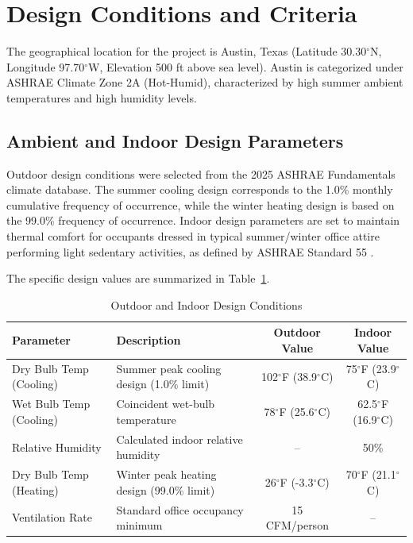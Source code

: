 \section{Design Conditions and Criteria}
\label{sec:design_conditions}

The geographical location for the project is Austin, Texas (Latitude 30.30$^{\circ}$N, Longitude 97.70$^{\circ}$W, Elevation 500 ft above sea level). Austin is categorized under ASHRAE Climate Zone 2A (Hot-Humid), characterized by high summer ambient temperatures and high humidity levels.

\subsection{Ambient and Indoor Design Parameters}
Outdoor design conditions were selected from the 2025 ASHRAE Fundamentals climate database. The summer cooling design corresponds to the 1.0\% monthly cumulative frequency of occurrence, while the winter heating design is based on the 99.0\% frequency of occurrence. Indoor design parameters are set to maintain thermal comfort for occupants dressed in typical summer/winter office attire performing light sedentary activities, as defined by ASHRAE Standard 55 \cite{ashrae55}.

The specific design values are summarized in Table~\ref{tab:design_conditions}.

\begin{table}[htbp]
\centering
\caption{Outdoor and Indoor Design Conditions}
\label{tab:design_conditions}
\begin{tabularx}{\textwidth}{l X c c}
\toprule
\textbf{Parameter} & \textbf{Description} & \textbf{Outdoor Value} & \textbf{Indoor Value} \\
\midrule
Dry Bulb Temp (Cooling) & Summer peak cooling design (1.0\% limit) & 102$^{\circ}$F (38.9$^{\circ}$C) & 75$^{\circ}$F (23.9$^{\circ}$C) \\
Wet Bulb Temp (Cooling) & Coincident wet-bulb temperature & 78$^{\circ}$F (25.6$^{\circ}$C) & 62.5$^{\circ}$F (16.9$^{\circ}$C) \\
Relative Humidity & Calculated indoor relative humidity & -- & 50\% \\
Dry Bulb Temp (Heating) & Winter peak heating design (99.0\% limit) & 26$^{\circ}$F (-3.3$^{\circ}$C) & 70$^{\circ}$F (21.1$^{\circ}$C) \\
Ventilation Rate & Standard office occupancy minimum & 15 CFM/person & -- \\
\bottomrule
\end{tabularx}
\end{table}

